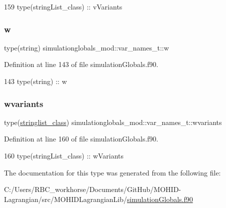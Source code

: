 \begin{DoxyCode}
159         \textcolor{keywordtype}{type}(stringList\_class) :: vVariants
\end{DoxyCode}
\mbox{\label{structsimulationglobals__mod_1_1var__names__t_ae4070fb0bad811c92b85bb008b3a269d}} 
\subsubsection{\texorpdfstring{w}{w}}
{\footnotesize\ttfamily type(string) simulationglobals\+\_\+mod\+::var\+\_\+names\+\_\+t\+::w\hspace{0.3cm}{\ttfamily [private]}}



Definition at line 143 of file simulation\+Globals.\+f90.


\begin{DoxyCode}
143         \textcolor{keywordtype}{type}(string) :: w
\end{DoxyCode}
\mbox{\label{structsimulationglobals__mod_1_1var__names__t_af3bc922623f55af5770d652861ec83a7}} 
\subsubsection{\texorpdfstring{wvariants}{wvariants}}
{\footnotesize\ttfamily type(\mbox{\hyperlink{structsimulationglobals__mod_1_1stringlist__class}{stringlist\+\_\+class}}) simulationglobals\+\_\+mod\+::var\+\_\+names\+\_\+t\+::wvariants\hspace{0.3cm}{\ttfamily [private]}}



Definition at line 160 of file simulation\+Globals.\+f90.


\begin{DoxyCode}
160         \textcolor{keywordtype}{type}(stringList\_class) :: wVariants
\end{DoxyCode}


The documentation for this type was generated from the following file\+:\begin{DoxyCompactItemize}
\item 
C\+:/\+Users/\+R\+B\+C\+\_\+workhorse/\+Documents/\+Git\+Hub/\+M\+O\+H\+I\+D-\/\+Lagrangian/src/\+M\+O\+H\+I\+D\+Lagrangian\+Lib/\mbox{\hyperlink{simulation_globals_8f90}{simulation\+Globals.\+f90}}\end{DoxyCompactItemize}
